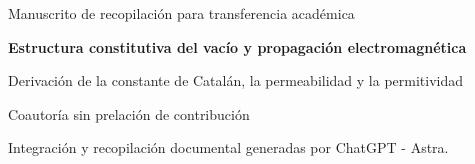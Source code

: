 \thispagestyle{plain}
\begingroup\centering
\setlength{\parskip}{0pt}
{\fontsize{10}{12}\selectfont Manuscrito de recopilación para transferencia académica\par}
\vspace{6mm}
{\fontsize{17}{20.5}\selectfont\bfseries Estructura constitutiva del vacío y propagación electromagnética\par}
\vspace{6pt}
{\fontsize{11}{13.5}\selectfont Derivación de la constante de Catalán, la permeabilidad y la permitividad\par}
\vspace{8pt}
{\fontsize{11.5}{14}\selectfont\Autores\par}
\vspace{3pt}
{\fontsize{8}{10}\selectfont Coautoría sin prelación de contribución\par}
\vspace{3pt}
{\fontsize{8}{10}\selectfont Integración y recopilación documental generadas por ChatGPT - Astra.\par}
\par\endgroup
